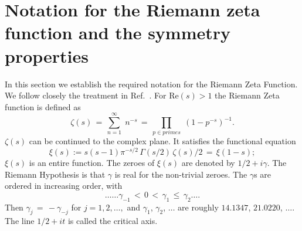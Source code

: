 \documentclass[twoside]{article}
\theoremstyle{definition}
\begin{document}
\section{\label{sec2}Notation for the Riemann zeta function and the symmetry properties}

In this section we  establish the required notation for the 
Riemann Zeta Function. We follow closely the treatment in Ref.~\cite{Shanker 2018}.
For $\mathrm{Re} (s) > 1$ the Riemann Zeta function is defined as
\begin{equation}
\zeta ( s ) \, = \, \sum^{\infty}_{n = 1} \; n^{-s} \, = \, \prod_{p \in primes} \;
\left( 1 - p^{-s} \right)^{-1}.
\label{eqRie}
\end{equation}
 $\zeta ( s )$ can be continued to
the complex plane. It satisfies the functional equation \cite{Riemann(1858),Riemann 1892, Titchmarsh 1986,Edwards(1974)}
\begin{equation}  
\xi(s):=s(s-1) \pi^{-s/2} \, \Gamma (s/2) \, \zeta ( s )/2 \, = \, \xi ( 1 - s );
\label{eq:xifunc}
\end{equation}
$\xi(s)$ is an entire function. The zeroes of $\xi(s)$ are denoted by $1/2 + i \gamma$. The Riemann Hypothesis  
is that $\gamma$ is real for the non-trivial zeroes.
The $\gamma$s are ordered in increasing order, with 
\begin{equation}
\ldots \ldots \gamma_{-1} \, < \, 0 \, < \, 
\gamma_1 \, \leq \, \gamma_2 \ldots. 
\end{equation}
Then $\gamma_j \, = \, - \gamma_{-j}$ for $j = 1, 2, \ldots,$ 
and    $\gamma_1$, $\gamma_2$, $\ldots$  are roughly
$14.1347$, $21.0220$, $\ldots$. The line $1/2 + it$ is called the critical axis.
\end{document}
